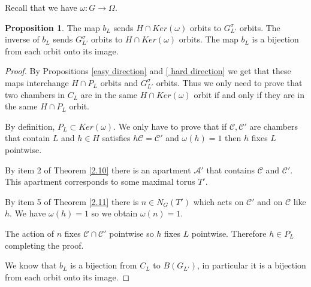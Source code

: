 \documentclass[12pt]{article}
\newcommand{\A}{\mathcal{A}}
\newcommand{\C}{\mathcal{C}}
\newcommand{\<}{\langle}
\renewcommand{\>}{\rangle}
\theoremstyle{plain}
\theoremstyle{definition}
\newtheorem{prop}[theorem]{Proposition}
\begin{document}
Recall that we have $\omega:G\rightarrow \Omega$.

\begin{prop}\label{orbit correspondacne}
    The map $b_L$ sends $H\cap Ker(\omega)$ orbits to $G^\sigma_{L'}$ orbits. The inverse of $b_L$ sends $G^\sigma_{L'}$ orbits to $H\cap Ker(\omega)$ orbits. The map $b_L$ is a bijection from each orbit onto its image.
\end{prop}

\begin{proof}
    By Propositions \ref{easy direction} and \ref{ hard direction} we get that these maps interchange $H\cap P_L$ orbits and $G^\sigma_{L'}$ orbits. Thus we only need to prove that two chambers in $C_L$ are in the same $H\cap Ker(\omega)$ orbit if and only if they are in the same $H\cap P_L$ orbit. 

    By definition, $P_L\subset Ker(\omega)$. We only have to prove that if $\C,\C'$ are chambers that contain $L$ and $h\in H$ satisfies $h\C=\C'$ and $\omega(h)=1$ then $h$ fixes $L$ pointwise.

    By item 2 of Theorem \ref{2.10} there is an apartment $\A'$ that contains $\C$ and $\C'$. This apartment corresponds to some maximal torus $T'$.

    By item 5 of Theorem \ref{2.11} there is $n\in N_G(T')$ which acts on $\C'$ and on $\C$ like $h$. We have $\omega(h)=1$ so we obtain $\omega(n)=1$.

    The action of $n$ fixes $\C\cap \C'$ pointwise so $h$ fixes $L$ pointwise. Therefore $h\in P_L$ completing the proof.

    We know that $b_L$ is a bijection from $C_L$ to $B(G_{L'})$, in particular it is a bijection from each orbit onto its image.
\end{proof}
\end{document}
